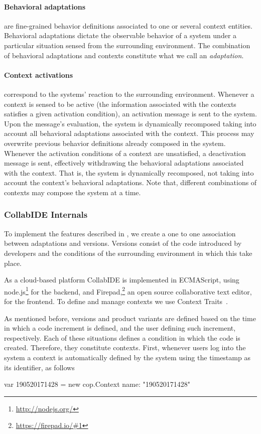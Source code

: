 \paragraph{Behavioral adaptations} are fine-grained behavior definitions associated to one or several 
context entities. Behavioral adaptations dictate the observable behavior of a system under a particular 
situation sensed from the surrounding environment. The combination of behavioral adaptations and 
contexts constitute what we call an \emph{adaptation}.

\paragraph{Context activations} correspond to the systems' reaction to the surrounding environment. 
Whenever a context is sensed to be active (the information associated with the contexts satisfies a 
given activation condition), an activation message is sent to the system. Upon the message's 
evaluation, the system is dynamically recomposed taking into account all behavioral adaptations 
associated with the context. This process may overwrite previous behavior definitions already 
composed in the system. Whenever the activation conditions of a context are unsatisfied, a 
deactivation message is sent, effectively withdrawing the behavioral adaptations associated with the 
context. That is, the system is dynamically recomposed, not taking into account the context's 
behavioral adaptations.  Note that, different combinations of contexts may compose the system at a 
time.


\subsubsection{CollabIDE Internals}
To implement the features described in , we create a one to one association 
between adaptations and versions.
Versions consist of the code introduced by developers and the conditions of the surrounding 
environment in which this take place. 

As a cloud-based platform CollabIDE is implemented in ECMAScript, using 
node.js\footnote{\url{http://nodejs.org/}} for the backend, and 
Firepad,\footnote{\url{https://firepad.io/\#1}} 
an open source collaborative text editor, for the frontend.
To define and manage contexts we use Context Traits~\cite{gonzalez13}. 

As mentioned before, versions and product variants are defined based on the time in which a code 
increment is defined, and the user defining such increment, respectively. Each of these situations 
defines a condition in which the code is created. Therefore, they constitute contexts.
First, whenever users log into the system a context is automatically defined by the system 
using the timestamp as its identifier, as follows
\begin{ctxtraits}
 var 190520171428 = new cop.Context{
   name: "190520171428"
 }
\end{ctxtraits}

